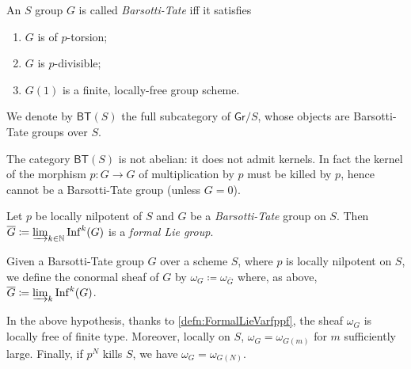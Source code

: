 \begin{defn}\label{BTGroup}
	An $S$ group $G$ is called {\em Barsotti-Tate} iff it satisfies
\begin{enumerate}
	\item $G$ is of $p$-torsion;
	\item $G$ is $p$-divisible;
	\item $G(1)$ is a finite, locally-free group scheme.
\end{enumerate}
	We denote by $\mathsf{BT}(S)$ the full subcategory of $\mathsf{Gr}/S$,
	whose objects are Barsotti-Tate groups over $S$.
\end{defn}


\begin{rem}[]
	The category $\mathsf{BT}(S)$ is not abelian:
	it does not admit kernels.
	In fact the kernel of the morphism $p\colon G \to G$
	of multiplication by $p$ must be killed by $p$, hence cannot be
	a Barsotti-Tate group (unless $G=0$).
\end{rem}


%
%
\begin{lem}
	Let $p$ be locally nilpotent of $S$ and $G$ be a {\em Barsotti-Tate} group on $S$.
	Then
	$\overline{G} \coloneqq \varinjlim_{k \in \mathbb{N}} \mathrm{Inf}^k(G)$
	is a {\em formal Lie group}.
\end{lem}


\begin{defn}
	Given a Barsotti-Tate group $G$ over a scheme $S$, where $p$ is locally nilpotent on $S$,
	we define the conormal sheaf of $G$ by $\omega_G \coloneqq \omega_{\overline{G}}$
	where, as above, $\overline{G} \coloneqq \varinjlim_k \mathrm{Inf}^k(G)$.
\end{defn}


\begin{rem}\label{rem:ConormalSheafBT}
	In the above hypothesis,
	thanks to \cref{defn:FormalLieVarfppf}, 
	the sheaf $\omega_G$ is
	locally free of finite type.
	Moreover, locally on $S$, $\omega_G = \omega_{G(m)}$ for
	$m$ sufficiently large.
	Finally, if $p^N$ kills $S$, we have $\omega_G = \omega_{G(N)}$.
\end{rem}



